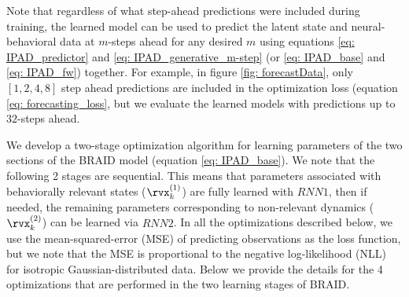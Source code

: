 \documentclass{article} %
\newcommand{\RNN}[1]{\(\textit{RNN#1}\)} %
\newcommand{\ourmethod}{BRAID}
\begin{document}
Note that regardless of what step-ahead predictions were included during training, the learned model can be used to predict the latent state and neural-behavioral data at $m$-steps ahead for any desired $m$ using equations \ref{eq: IPAD_predictor} and \ref{eq: IPAD_generative_m-step} (or \ref{eq: IPAD_base} and \ref{eq: IPAD_fw}) together. For example, in figure \ref{fig: forecastData}, only $[1, 2, 4, 8]$ step ahead predictions are included in the optimization loss (equation \ref{eq: forecasting_loss}, but we evaluate the learned models with predictions up to $32$-steps ahead. 

We develop a two-stage optimization algorithm for learning parameters of the two sections of the \ourmethod{} model (equation \ref{eq: IPAD_base}). We note that the following 2 stages are sequential. This means that parameters associated with behaviorally relevant states (\(\rvx_{k}^{(1)}\)) are fully learned with \RNN1, then if needed, the remaining parameters corresponding to non-relevant dynamics (\(\rvx_{k}^{(2)}\)) can be learned via \RNN2. In all the optimizations described below, we use the mean-squared-error (MSE) of predicting observations as the loss function, but we note that the MSE is proportional to the negative log-likelihood (NLL) for isotropic Gaussian-distributed data. Below we provide the details for the 4 optimizations that are performed in the two learning stages of \ourmethod{}.
\end{document}
